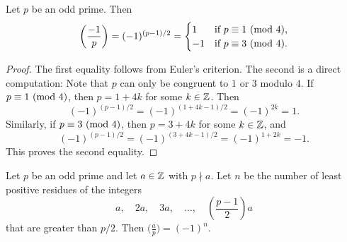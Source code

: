 \begin{theorem}
  Let $p$ be an odd prime. Then
  \[
    \left( \frac{-1}{p} \right)
    = (-1)^{(p - 1) / 2}
    = \begin{cases}
      1 & \text{if $p \equiv 1 \ (\mathrm{mod}\ 4)$,} \\
      -1 & \text{if $p \equiv 3 \ (\mathrm{mod}\ 4)$.}
    \end{cases}
  \]
\end{theorem}

\begin{proof}
  The first equality follows
  from Euler's criterion. The
  second is a direct computation:
  Note that $p$ can only be
  congruent to $1$ or $3$ modulo $4$.
  If $p \equiv 1 \ (\mathrm{mod}\ 4)$, then
  $p = 1 + 4k$ for some $k \in \mathbb{Z}$. Then
  \[
    (-1)^{(p - 1) / 2}
    = (-1)^{(1 + 4k - 1) / 2}
    = (-1)^{2k}
    = 1.
  \]
  Similarly, if $p \equiv 3 \ (\mathrm{mod}\ 4)$,
  then $p = 3 + 4k$ for some
  $k \in \mathbb{Z}$, and
  \[
    (-1)^{(p - 1) / 2}
    = (-1)^{(3 + 4k - 1) / 2}
    = (-1)^{1 + 2k}
    = -1.
  \]
  This proves the second equality.
\end{proof}

\begin{lemma}
  Let $p$ be an odd prime and let
  $a \in \mathbb{Z}$ with $p \nmid a$. Let
  $n$ be the number of least positive
  residues of the integers
  \[
    a, \quad 2a, \quad 3a, \quad \dots, \quad
    \left(\frac{p - 1}{2}\right) a
  \]
  that are greater than $p / 2$. Then
  $\big(\frac{a}{p}\big) = (-1)^n$.
\end{lemma}

